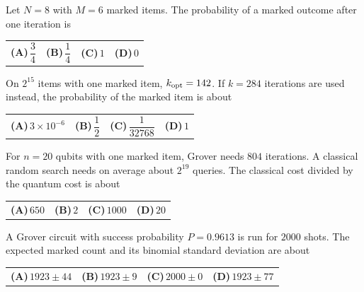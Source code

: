 \documentclass[11pt,a4paper]{article}
\newcommand{\optlabel}[1]{\textbf{(#1)}}
\newenvironment{qitem}[1]{\begin{list}{}{\setlength{\leftmargin}{3.3em}\setlength{\labelwidth}{3.1em}%
  \setlength{\labelsep}{0.2em}\setlength{\topsep}{3pt}\setlength{\parsep}{3pt}}\item[\textbf{Q.#1}\hfill]}{\end{list}}
\newcommand{\qsep}{\par\vspace{2pt}{\color{black!15}\hrule}\vspace{4pt}}
\begin{document}
\begin{qitem}{51}
Let $N = 8$ with $M = 6$ marked items. The probability of a marked outcome after one iteration is
\par\smallskip\noindent\begin{tabularx}{\linewidth}{@{}*{4}{L}@{}}
\optlabel{A}\,$\dfrac34$ & \optlabel{B}\,$\dfrac14$ & \optlabel{C}\,$1$ & \optlabel{D}\,$0$
\end{tabularx}
\end{qitem}
\qsep

\begin{qitem}{52}
On $2^{15}$ items with one marked item, $k_{\rm opt} = 142$. If $k = 284$ iterations are used instead, the probability of the marked item is about
\par\smallskip\noindent\begin{tabularx}{\linewidth}{@{}*{4}{L}@{}}
\optlabel{A}\,$3\times10^{-6}$ & \optlabel{B}\,$\dfrac12$ & \optlabel{C}\,$\dfrac{1}{32768}$ & \optlabel{D}\,$1$
\end{tabularx}
\end{qitem}
\qsep

\begin{qitem}{53}
For $n = 20$ qubits with one marked item, Grover needs $804$ iterations. A classical random search needs on average about $2^{19}$ queries. The classical cost divided by the quantum cost is about
\par\smallskip\noindent\begin{tabularx}{\linewidth}{@{}*{4}{L}@{}}
\optlabel{A}\,$650$ & \optlabel{B}\,$2$ & \optlabel{C}\,$1000$ & \optlabel{D}\,$20$
\end{tabularx}
\end{qitem}
\qsep

\begin{qitem}{54}
A Grover circuit with success probability $P = 0.9613$ is run for $2000$ shots. The expected marked count and its binomial standard deviation are about
\par\smallskip\noindent\begin{tabularx}{\linewidth}{@{}*{4}{L}@{}}
\optlabel{A}\,$1923 \pm 44$ & \optlabel{B}\,$1923 \pm 9$ & \optlabel{C}\,$2000 \pm 0$ & \optlabel{D}\,$1923 \pm 77$
\end{tabularx}
\end{qitem}
\qsep
\end{document}
